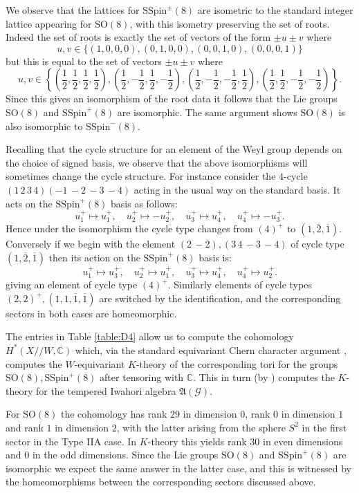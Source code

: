 \documentclass[11pt,a4paper]{article}
\def\SSpin{\mathrm{SSpin}}
\def\SO{\mathrm{SO}}
\def\SSpin{\mathrm{SSpin}}
\def\fA{\mathfrak{A}}
\def\fA{\mathfrak{A}}
\def\q {{/\!/}}
\def\G{\mathcal{G}}
\begin{document}
We observe that the lattices for $\SSpin^\pm(8)$ are isometric to the standard integer lattice appearing for $\SO(8)$, with this isometry preserving the set of roots. Indeed the set of roots is exactly the set of vectors of the form $\pm u\pm v$ where 
\[u,v\in \{(1,0,0,0),(0,1,0,0),(0,0,1,0),(0,0,0,1)\}
\]
but this is equal to the set of vectors $\pm u\pm v$ where 
\[u,v\in \left\{\left(\frac12,\frac12,\frac12,\frac12\right),
\left(\frac12,-\frac12,\frac12,-\frac12\right),\left(\frac12,-\frac12,-\frac12,\frac12\right),
\left(\frac12,\frac12,-\frac12,-\frac12\right)\right\}.
\]
Since this gives an isomorphism of the root data it follows that the Lie groups $\SO(8)$ and $\SSpin^+(8)$ are isomorphic.  The same argument shows $\SO(8)$ is also isomorphic to $\SSpin^-(8)$.

Recalling that the cycle structure for an element of the Weyl group depends on the choice of signed basis, we observe that the above isomorphisms will sometimes change the cycle structure.  For instance consider the $4$-cycle $(1\,2\,3\,4)(-1\,-2\,-3\,-4)$ acting in the usual way on the standard basis.  It acts on the $\SSpin^+(8)$ basis as follows:
\[
u_1^+\mapsto u_1^+,\quad u_2^+\mapsto-u_2^+,\quad u_3^+\mapsto u_4^+,\quad u_4^+\mapsto -u_3^+.
\]
Hence under the isomorphism the cycle type changes from $(4)^+$ to $(1,\overline{2},\overline{1})$. Conversely if we begin with the element $(2\,-2),(3\,4\,-3\,-4)$ of cycle type $(1,\overline{2},\overline{1})$ then its action on the $\SSpin^+(8)$ basis is:
\[
u_1^+\mapsto u_3^+,\quad u_2^+\mapsto u_1^+,\quad u_3^+\mapsto u_4^+,\quad u_4^+\mapsto u_2^+.
\]
giving an element of cycle type $(4)^+$. Similarly elements of cycle types $(2,2)^+, (1,1,\overline 1, \overline 1)$ are switched by the identification, and the corresponding sectors in both cases are homeomorphic.






\bigskip

The entries in Table \ref{table:D4} allow us to compute the cohomology $H^*(X\q W, \mathbb C)$ which, via the standard equivariant Chern character argument \cite{BaumConneschern}, computes the $W$-equivariant $K$-theory of the corresponding tori for the groups $\SO(8), \SSpin^+(8)$ after tensoring with $\mathbb C$. This in turn (by \cite{ABPS2}) computes the $K$-theory for the tempered Iwahori algebra $\fA(\G)$.

For $\SO(8)$ the cohomology has rank $29$ in dimension $0$, rank $0$ in dimension $1$ and rank $1$ in dimension $2$, with the latter arising from the sphere $S^2$ in the  first sector in the Type IIA case. In $K$-theory this yields rank $30$ in even dimensions and $0$ in the odd dimensions. Since the Lie groups $\SO(8)$ and $\SSpin^+(8)$ are isomorphic we expect the same answer in the latter case, and this is witnessed by the homeomorphisms between the corresponding sectors discussed above.
\end{document}
